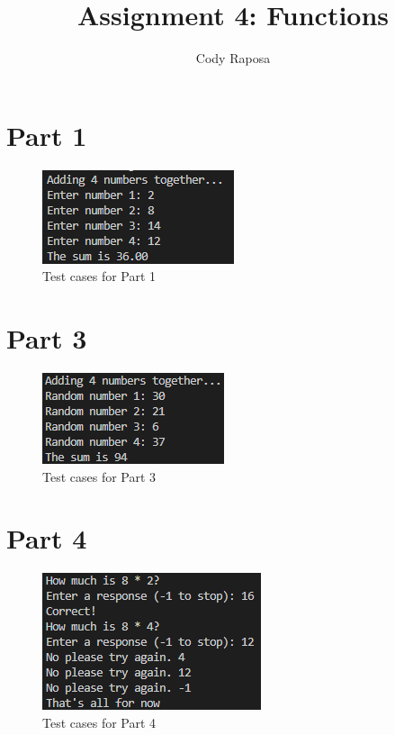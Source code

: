 \documentclass{article}
\title{Assignment 4: Functions}
\author{Cody Raposa}
\affil{ELEC2850 Microcontrollers Using C Programming}
\begin{document}
\maketitle
\begin{flushleft}
  \section{Part 1}
  \begin{figure}[!h]
    \begin{centering}
      \includegraphics[scale=1]{P1_output.png}
      \caption{Test cases for Part 1}
    \end{centering}
  \end{figure}
  
  \newpage
  \section{Part 3}
  \begin{figure}[!h]
    \begin{centering}
      \includegraphics[scale=1]{P3_output.png}
      \caption{Test cases for Part 3}
    \end{centering}
  \end{figure}
  
  \section{Part 4}
  \begin{figure}[!h]
    \begin{centering}
      \includegraphics[scale=1]{P4_output.png}
      \caption{Test cases for Part 4}
    \end{centering}
  \end{figure}
  \newpage
  
  \newpage

\end{flushleft}
\end{document}
